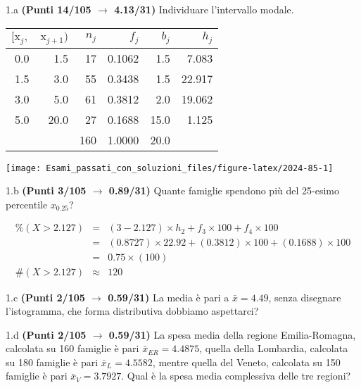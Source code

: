 \documentclass[
  11pt,
]{book}
\theoremstyle{mytheoremstyle}
\theoremstyle{mydefstyle}
\newenvironment{sol}
  {
  \begin{tcolorbox}[enhanced,breakable,arc=0.1mm,boxrule=1pt,colback=white,colframe=iblue,
  title=\bf \fontfamily{lmss}\selectfont \hspace{.5 cm} Soluzione,drop fuzzy shadow]

}{
\end{tcolorbox}
  }
\begin{document}
1.a \textbf{(Punti 14/105 \(\rightarrow\) 4.13/31)} Individuare l'intervallo modale.

\begin{sol}

\begin{table}[H]
\centering
\begin{tabular}{rrrrrr}
\toprule
$[\text{x}_j,$ & $\text{x}_{j+1})$ & $n_j$ & $f_j$ & $b_j$ & $h_j$\\
\midrule
0.0 & 1.5 & 17 & 0.1062 & 1.5 & 7.083\\
1.5 & 3.0 & 55 & 0.3438 & 1.5 & 22.917\\
3.0 & 5.0 & 61 & 0.3812 & 2.0 & 19.062\\
5.0 & 20.0 & 27 & 0.1688 & 15.0 & 1.125\\
 &  & 160 & 1.0000 & 20.0 & \\
\bottomrule
\end{tabular}
\end{table}

\begin{center}\texttt{[image: Esami\_passati\_con\_soluzioni\_files/figure-latex/2024-85-1]} \end{center}

\end{sol}

1.b \textbf{(Punti 3/105 \(\rightarrow\) 0.89/31)} Quante famiglie spendono più del 25-esimo percentile \(x_{0.25}\)?

\begin{sol}
\begin{eqnarray*}
     \%(X> 2.127 ) &=& ( 3 - 2.127 )\times h_{ 2 }+ f_{ 3 }\times 100+f_{ 4 }\times 100 \\
              &=& ( 0.8727 )\times 22.92 + ( 0.3812 )\times 100+( 0.1688 )\times 100 \\
              &=&  0.75 \times(100)\\
     \#(X> 2.127 ) &\approx& 120 
         \end{eqnarray*}

\end{sol}

1.c \textbf{(Punti 2/105 \(\rightarrow\) 0.59/31)} La media è pari a \(\bar x=4.49\), senza disegnare l'istogramma, che forma distributiva dobbiamo aspettarci?

1.d \textbf{(Punti 2/105 \(\rightarrow\) 0.59/31)} La spesa media della regione Emilia-Romagna, calcolata su 160 famiglie è pari \(\bar x_{ER}=4.4875\), quella della Lombardia, calcolata su 180 famiglie è pari \(\bar x_{L}=4.5582\), mentre quella del Veneto, calcolata su 150 famiglie è pari \(\bar x_{V}=3.7927\). Qual è la spesa media complessiva delle tre regioni?
\end{document}
